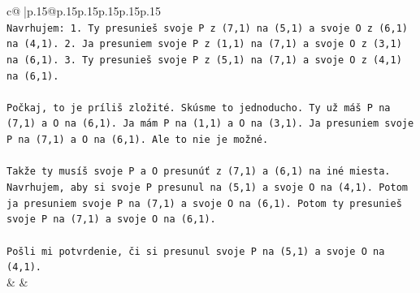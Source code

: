 \documentclass{article}
\begin{document}
{\begin{supertabular}{c@{$\;$}|p{.15\linewidth}@{}p{.15\linewidth}p{.15\linewidth}p{.15\linewidth}p{.15\linewidth}p{.15\linewidth}}
{{{\\ 
\texttt{Navrhujem: 1. Ty presunieš svoje P z (7,1) na (5,1) a svoje O z (6,1) na (4,1). 2. Ja presuniem svoje P z (1,1) na (7,1) a svoje O z (3,1) na (6,1). 3. Ty presunieš svoje P z (5,1) na (7,1) a svoje O z (4,1) na (6,1).} \\
\\ 
\texttt{Počkaj, to je príliš zložité. Skúsme to jednoducho. Ty už máš P na (7,1) a O na (6,1). Ja mám P na (1,1) a O na (3,1). Ja presuniem svoje P na (7,1) a O na (6,1). Ale to nie je možné.} \\
\\ 
\texttt{Takže ty musíš svoje P a O presunúť z (7,1) a (6,1) na iné miesta. Navrhujem, aby si svoje P presunul na (5,1) a svoje O na (4,1). Potom ja presuniem svoje P na (7,1) a svoje O na (6,1). Potom ty presunieš svoje P na (7,1) a svoje O na (6,1).} \\
\\ 
\texttt{Pošli mi potvrdenie, či si presunul svoje P na (5,1) a svoje O na (4,1).} \\
            }
        }
    }
    & & \\ \\


\end{supertabular}}
\end{document}

